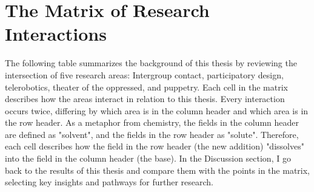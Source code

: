 \documentclass[dissertation,math,vertlayout,pdfa,colorlinks]{aaltoseries}
\begin{document}
\section{The Matrix of Research Interactions}
\label{sec:matrix_of_intersections}
The following table summarizes the background of this thesis by reviewing the intersection of five research areas: Intergroup contact, participatory design, telerobotics, theater of the oppressed, and puppetry. Each cell in the matrix describes how the areas interact in relation to this thesis. Every interaction occurs twice, differing by which area is in the column header and which area is in the row header. As a metaphor from chemistry, the fields in the column header are defined as "solvent", and the fields in the row header as "solute". Therefore, each cell describes how the field in the row header (the new addition) "dissolves" into the field in the column header (the base). In the Discussion section, I go back to the results of this thesis and compare them with the points in the matrix, selecting key insights and pathways for further research.


\end{document}
